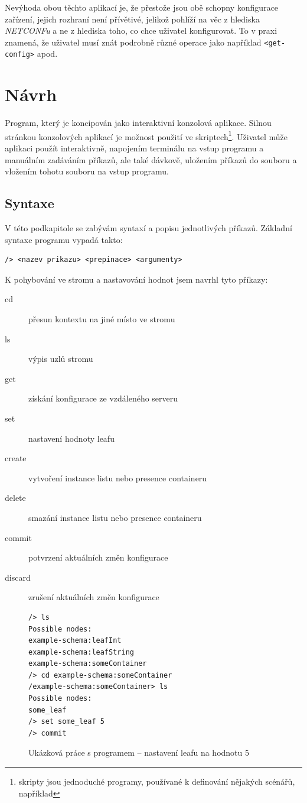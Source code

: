 \documentclass[thesis=B,czech,hidelinks]{FITthesis}[2019/03/06]
\begin{document}
Nevýhoda obou těchto aplikací je, že přestože jsou obě schopny konfigurace zařízení, jejich rozhraní není přívětivé, jelikož pohlíží na věc z hlediska \textit{NETCONFu} a ne z hlediska toho, co chce uživatel konfigurovat. To v praxi znamená, že uživatel musí znát podrobně různé operace jako například \texttt{<get-config>} apod.


\chapter{Návrh}
Program, který  je koncipován jako interaktivní konzolová aplikace. Silnou stránkou konzolových aplikací je možnost použití ve skriptech\footnote{skripty jsou jednoduché programy, používané k definování nějakých scénářů, například }. Uživatel může aplikaci použít interaktivně, napojením terminálu na vstup programu a manuálním zadáváním příkazů, ale také dávkově, uložením příkazů do souboru a vložením tohotu souboru na vstup programu.


\section{Syntaxe}
V této podkapitole se zabývám syntaxí a popisu jednotlivých příkazů. Základní syntaxe programu vypadá takto:
\begin{verbatim}
/> <nazev prikazu> <prepinace> <argumenty>
\end{verbatim}
K pohybování ve stromu a nastavování hodnot jsem navrhl tyto příkazy:

\begin{description}
\item[cd]{přesun kontextu na jiné místo ve stromu}
\item[ls]{výpis uzlů stromu}
\item[get]{získání konfigurace ze vzdáleného serveru}
\item[set]{nastavení hodnoty leafu}
\item[create]{vytvoření instance listu nebo presence containeru}
\item[delete]{smazání instance listu nebo presence containeru}
\item[commit]{potvrzení aktuálních změn konfigurace}
\item[discard]{zrušení aktuálních změn konfigurace}
\end{description}

\begin{figure}
\begin{verbatim}
/> ls
Possible nodes:
example-schema:leafInt
example-schema:leafString
example-schema:someContainer
/> cd example-schema:someContainer
/example-schema:someContainer> ls
Possible nodes:
some_leaf
/> set some_leaf 5
/> commit
\end{verbatim}
\caption{Ukázková práce s programem -- nastavení leafu na hodnotu 5}\label{ukazka}
\end{figure}
\end{document}
